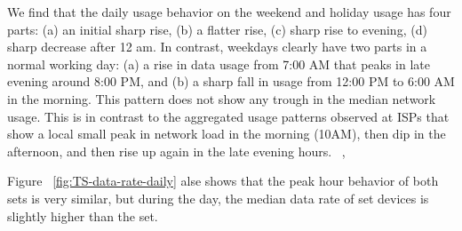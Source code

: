 We find that the daily usage behavior on the weekend and holiday usage has four parts: (a) an initial sharp rise, (b) a flatter rise, (c) sharp rise to evening, (d) sharp decrease after 12 am.
In contrast, weekdays clearly have two parts in a normal working day: (a) a rise in data usage from 7:00 AM that peaks in late evening around 8:00 PM, and (b) a sharp fall in usage from 12:00 PM to 6:00 AM in the morning. This pattern does not show any trough in the median network usage. This is in contrast to the aggregated usage patterns observed at ISPs that show a local small peak in network load in the morning (10AM), then dip in the afternoon, and then rise up again in the late evening hours. ~\cite{sandvine2014report1}, 

Figure ~\ref{fig:TS-data-rate-daily} alse shows that the peak hour behavior of both sets is very similar, but during the day, the median data rate of \test set devices is slightly higher  than the \control set. 


